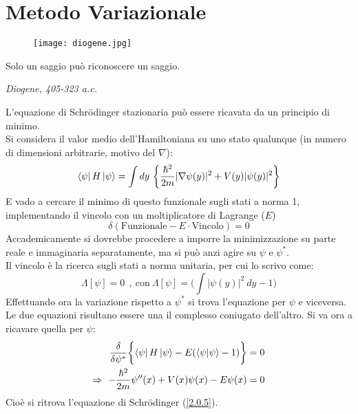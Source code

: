 \documentclass[twoside]{article}
\begin{document}
\newpage

\section{Metodo Variazionale}

\begin{wrapfigure}[4]{L}{0.2\textwidth}
  \begin{center}
    \texttt{[image: diogene.jpg]}
  \end{center}
\end{wrapfigure}\leavevmode

\vspace{12mm}
\epigraph{Solo un saggio può riconoscere un saggio.}{\textit{Diogene, 405-323 a.c.}}
\vspace{12mm}

L'equazione di Schr\"odinger stazionaria può essere ricavata da un principio di minimo.
\\
Si considera il valor medio dell'Hamiltoniana su uno stato qualunque (in numero di dimensioni arbitrarie, motivo del $\nabla$):
\begin{equation}
    \bra{\psi}H\ket{\psi}=\int dy \ \biggl\{ \frac{\hbar^2}{2m}|\nabla\psi(y)|^2 + V(y)|\psi(y)|^2 \biggr\}
\end{equation}
E vado a cercare il minimo di questo funzionale sugli stati a norma 1, implementando il vincolo con un moltiplicatore di Lagrange ($E$)
\begin{equation}
    \delta(\text{Funzionale} - E \cdot \text{Vincolo})=0
\end{equation}
Accademicamente si dovrebbe procedere a imporre la minimizzazione su parte reale e immaginaria separatamente, ma si può anzi agire su $\psi$ e $\psi^*$.
\\
Il vincolo è la ricerca sugli stati a norma unitaria, per cui lo scrivo come:
\begin{equation}
    \Lambda[\psi]=0 \ \ , \ \text{con} \ \Lambda[\psi]= \biggl(\int |\psi(y)|^2 \ dy - 1\biggr)
\end{equation}
Effettuando ora la variazione rispetto a $\psi^*$ si trova l'equazione per $\psi$ e viceversa. Le due equazioni risultano essere una il complesso coniugato dell'altro. Si va ora a ricavare quella per $\psi$:
\begin{equation} \begin{split}
    \frac{\delta}{\delta \psi^*} \biggl\{ \bra{\psi}H\ket{\psi} - E(\bra{\psi}\ket{\psi}-1)\biggr\}=0 \\
    \Rightarrow  \ -\frac{\hbar^2}{2m}\psi''(x) +V(x)\psi(x) -E\psi(x) =0 
\end{split} \end{equation}
Cioè si ritrova l'equazione di Schr\"odinger (\ref{2.0.5}).
\end{document}
